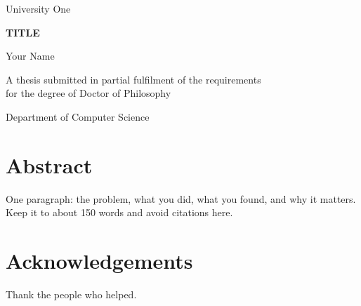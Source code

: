 \documentclass[12pt,a4paper,oneside,openany]{book}
\begin{document}
\frontmatter
\begin{titlepage}
  \centering
  \vspace*{2cm}
  {\large University One\par}
  \vspace{3cm}
  {\Huge\bfseries {{TITLE}}\par}
  \vspace{2cm}
  {\Large Your Name\par}
  \vfill
  A thesis submitted in partial fulfilment of the requirements\\
  for the degree of Doctor of Philosophy\par
  \vspace{1cm}
  {\large Department of Computer Science\\ \the\year\par}
\end{titlepage}

\chapter*{Abstract}
One paragraph: the problem, what you did, what you found, and why it matters. Keep it to about 150 words and avoid citations here.

\chapter*{Acknowledgements}
Thank the people who helped.

\tableofcontents

\mainmatter



\backmatter


\end{document}
